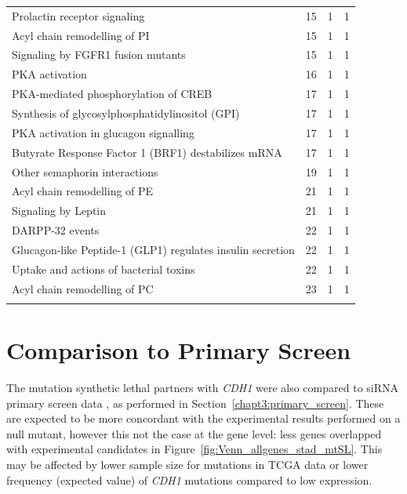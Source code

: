 \begin{table}[!hp]
{\begin{tabular}{lccc}
  \rowcolor{Cluster_Red!15}
  Prolactin receptor signaling &  15 &   1 &   1 \\ 
  \rowcolor{Cluster_Red!20}
  Acyl chain remodelling of PI &  15 &   1 &   1 \\ 
  \rowcolor{Cluster_Red!15}
  Signaling by FGFR1 fusion mutants &  15 &   1 &   1 \\ 
  \rowcolor{Cluster_Red!20}
  PKA activation &  16 &   1 &   1 \\ 
  \rowcolor{Cluster_Red!15}
  PKA-mediated phosphorylation of CREB &  17 &   1 &   1 \\ 
  \rowcolor{Cluster_Red!20}
  Synthesis of glycosylphosphatidylinositol (GPI) &  17 &   1 &   1 \\ 
  \rowcolor{Cluster_Red!15}
  PKA activation in glucagon signalling &  17 &   1 &   1 \\ 
  \rowcolor{Cluster_Red!20}
  Butyrate Response Factor 1 (BRF1) destabilizes mRNA &  17 &   1 &   1 \\ 
  \rowcolor{Cluster_Red!15}
  Other semaphorin interactions &  19 &   1 &   1 \\ 
  \rowcolor{Cluster_Red!20}
  Acyl chain remodelling of PE &  21 &   1 &   1 \\ 
  \rowcolor{Cluster_Red!15}
  Signaling by Leptin &  21 &   1 &   1 \\ 
  \rowcolor{Cluster_Red!20}
  DARPP-32 events &  22 &   1 &   1 \\ 
  \rowcolor{Cluster_Red!15}
  Glucagon-like Peptide-1 (GLP1) regulates insulin secretion &  22 &   1 &   1 \\ 
  \rowcolor{Cluster_Red!20}
  Uptake and actions of bacterial toxins &  22 &   1 &   1 \\ 
  \rowcolor{Cluster_Red!15}
  Acyl chain remodelling of PC &  23 &   1 &   1 \\ 
  \hline
  \\
\end{tabular}
}
\end{table}

\FloatBarrier

\section{Comparison to Primary Screen} \label{appendix:compare_mtSL_genes_stad}

The mutation synthetic lethal partners with \textit{CDH1} were also compared to siRNA primary screen data \citep{Telford2015}, as performed in Section~\ref{chapt3:primary_screen}. These are expected to be more concordant with the experimental results performed on a null mutant, however this not the case at the gene level: less genes overlapped with experimental candidates in Figure~\ref{fig:Venn_allgenes_stad_mtSL}. This may be affected by lower sample size for mutations in TCGA data or lower frequency (expected value) of \textit{CDH1} mutations compared to low expression. 

